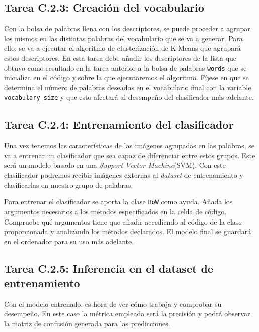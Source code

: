 \subsection*{Tarea C.2.3: Creación del vocabulario}

Con la bolsa de palabras llena con los descriptores, se puede proceder a agrupar los mismos en las distintas palabras del vocabulario que se va a generar. Para ello, se va a ejecutar el algoritmo de clusterización de K-Means que agrupará estos descriptores. En esta tarea debe añadir los descriptores de la lista que obtuvo como resultado en la tarea anterior a la bolsa de palabras \texttt{words} que se inicializa en el código y sobre la que ejecutaremos el algoritmo. Fíjese en que se determina el número de palabras deseadas en el vocabulario final con la variable \texttt{vocabulary\_size} y que esto afectará al desempeño del clasificador más adelante.

\subsection*{Tarea C.2.4: Entrenamiento del clasificador}

Una vez tenemos las características de las imágenes agrupadas en las palabras, se va a entrenar un clasificador que sea capaz de diferenciar entre estos grupos. Este será un modelo basado en una  \textit{Support Vector Machine}(SVM). Con este clasificador podremos recibir imágenes externas al \textit{dataset} de entrenamiento y clasificarlas en nuestro grupo de palabras.

Para entrenar el clasificador se aporta la clase \texttt{BoW} como ayuda. Añada los argumentos necesarios a los métodos especificados en la celda de código. Compruebe qué argumentos tiene que añadir accediendo al código de la clase proporcionada y analizando los métodos declarados. El modelo final se guardará en el ordenador para su uso más adelante.

\subsection*{Tarea C.2.5: Inferencia en el dataset de entrenamiento}

Con el modelo entrenado, es hora de ver cómo trabaja y comprobar su desempeño. En este caso la métrica empleada será la precisión y podrá observar la matriz de confusión generada para las predicciones.

